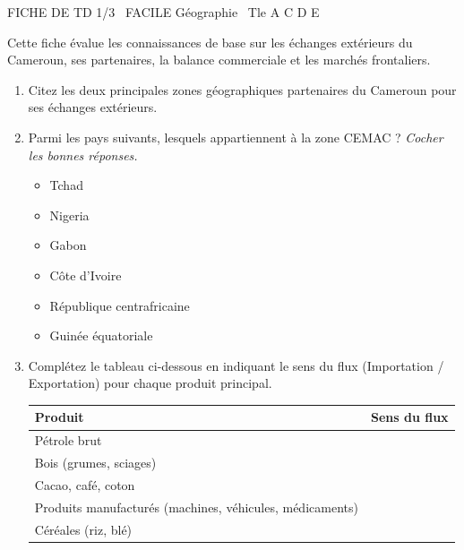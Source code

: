 \documentclass[11pt]{article}
\begin{document}
\begin{tcolorbox}[enhanced,colback=popink,colframe=popink,arc=10pt,boxrule=0pt,left=12pt,right=12pt,top=9pt,bottom=9pt]
{\color{white}\popxbold\small FICHE DE TD 1/3 \textbullet\ FACILE \hfill Géographie \textbullet\ Tle A C D E\par}
\end{tcolorbox}
\vspace{4pt}
Cette fiche évalue les connaissances de base sur les échanges extérieurs du Cameroun, ses partenaires, la balance commerciale et les marchés frontaliers.

\begin{exercice}
\begin{enumerate}
    \item Citez les deux principales zones géographiques partenaires du Cameroun pour ses échanges extérieurs.
    \item Parmi les pays suivants, lesquels appartiennent à la zone CEMAC ? \textit{Cocher les bonnes réponses.}
    \begin{itemize}
        \item [ ] Tchad \quad \item [ ] Nigeria \quad \item [ ] Gabon \quad \item [ ] Côte d'Ivoire \quad \item [ ] République centrafricaine \quad \item [ ] Guinée équatoriale
    \end{itemize}
    \item Complétez le tableau ci-dessous en indiquant le sens du flux (Importation / Exportation) pour chaque produit principal.
    \begin{tabular}{|l|c|}
    \hline
    \textbf{Produit} & \textbf{Sens du flux} \\
    \hline
    Pétrole brut & \\
    \hline
    Bois (grumes, sciages) & \\
    \hline
    Cacao, café, coton & \\
    \hline
    Produits manufacturés (machines, véhicules, médicaments) & \\
    \hline
    Céréales (riz, blé) & \\
    \hline
    \end{tabular}
\end{enumerate}
\end{exercice}
\end{document}
